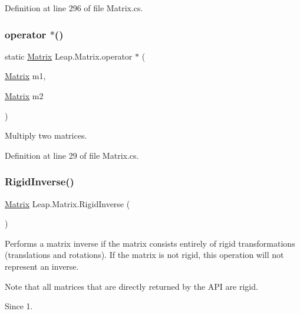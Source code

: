 Definition at line 296 of file Matrix.\+cs.

\mbox{\label{struct_leap_1_1_matrix_a9229388e085ffc3a95a2f3236b4d8ff8}} 
\subsubsection{\texorpdfstring{operator $\ast$()}{operator *()}}
{\footnotesize\ttfamily static \mbox{\hyperlink{struct_leap_1_1_matrix}{Matrix}} Leap.\+Matrix.\+operator $\ast$ (\begin{DoxyParamCaption}\item[{\mbox{\hyperlink{struct_leap_1_1_matrix}{Matrix}}}]{m1,  }\item[{\mbox{\hyperlink{struct_leap_1_1_matrix}{Matrix}}}]{m2 }\end{DoxyParamCaption})\hspace{0.3cm}{\ttfamily [static]}}



Multiply two matrices. 



Definition at line 29 of file Matrix.\+cs.

\mbox{\label{struct_leap_1_1_matrix_a5871fb349967846eab0d702d54d32ead}} 
\subsubsection{\texorpdfstring{RigidInverse()}{RigidInverse()}}
{\footnotesize\ttfamily \mbox{\hyperlink{struct_leap_1_1_matrix}{Matrix}} Leap.\+Matrix.\+Rigid\+Inverse (\begin{DoxyParamCaption}{ }\end{DoxyParamCaption})}



Performs a matrix inverse if the matrix consists entirely of rigid transformations (translations and rotations). If the matrix is not rigid, this operation will not represent an inverse. 

Note that all matrices that are directly returned by the A\+PI are rigid.

\begin{DoxySince}{Since}
1. 
\end{DoxySince}


